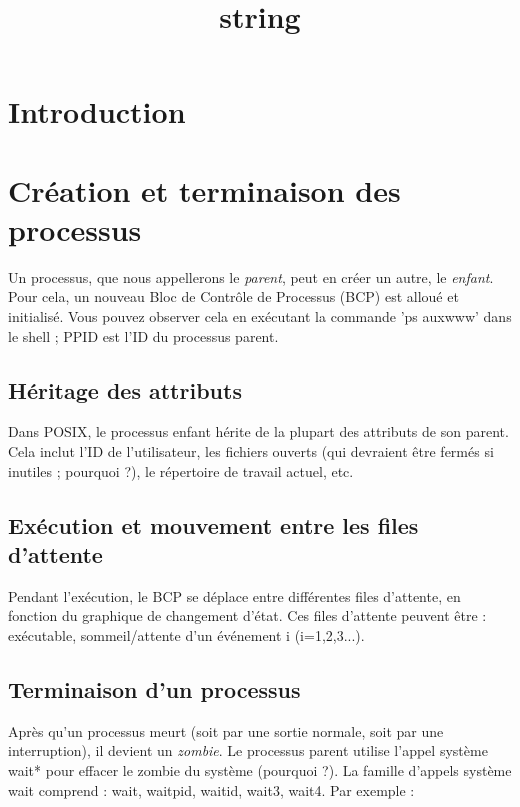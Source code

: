 \documentclass[12pt]{report}
\title{string}
\author{}
\begin{document}
\maketitle
\tableofcontents
\newpage

\section{Introduction}
\section{Création et terminaison des processus}

Un processus, que nous appellerons le \textit{parent}, peut en créer un autre, le \textit{enfant}. Pour cela, un nouveau Bloc de Contrôle de Processus (BCP) est alloué et initialisé. Vous pouvez observer cela en exécutant la commande 'ps auxwww' dans le shell ; PPID est l'ID du processus parent.

\subsection{Héritage des attributs}

Dans POSIX, le processus enfant hérite de la plupart des attributs de son parent. Cela inclut l'ID de l'utilisateur, les fichiers ouverts (qui devraient être fermés si inutiles ; pourquoi ?), le répertoire de travail actuel, etc.

\subsection{Exécution et mouvement entre les files d'attente}

Pendant l'exécution, le BCP se déplace entre différentes files d'attente, en fonction du graphique de changement d'état. Ces files d'attente peuvent être : exécutable, sommeil/attente d'un événement i (i=1,2,3...).

\subsection{Terminaison d'un processus}

Après qu'un processus meurt (soit par une sortie normale, soit par une interruption), il devient un \textit{zombie}. Le processus parent utilise l'appel système wait* pour effacer le zombie du système (pourquoi ?). La famille d'appels système wait comprend : wait, waitpid, waitid, wait3, wait4. Par exemple :
\end{document}
